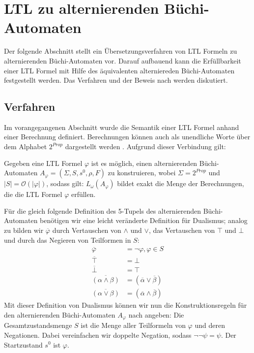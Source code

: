 \section{LTL zu alternierenden Büchi-Automaten}

Der folgende Abschnitt stellt ein Übersetzungsverfahren von LTL Formeln zu alternierenden Büchi-Automaten vor. Darauf aufbauend kann die Erfüllbarkeit einer LTL Formel mit Hilfe des äquivalenten alterniereden Büchi-Automaten festgestellt werden. Das Verfahren und der Beweis nach \cite{vardi+96} werden diskutiert.


\subsection{Verfahren}
\label{subsection:verfahren}
Im vorangegangenen Abschnitt wurde die Semantik einer LTL Formel anhand einer Berechnung definiert. Berechnungen können auch als unendliche Worte über dem Alphabet $2^{Prop}$ dargestellt werden \cite{vardi+96}. Aufgrund dieser Verbindung gilt:
\begin{satz}\cite{vardi+96}
\label{LTL->ABA}
    Gegeben eine LTL Formel $\varphi$ ist es möglich, einen alternierenden Büchi-Automaten $A_\varphi = (\Sigma, S, s^0, \rho, F)$ zu konstruieren, wobei $\Sigma = 2^{Prop}$ und $|S| = \mathcal{O}(|\varphi|)$, sodass gilt: $L_\omega(A_\varphi)$ bildet exakt die Menge der Berechnungen, die die LTL Formel $\varphi$ erfüllen.
\end{satz}
Für die gleich folgende Definition des 5-Tupels des alternierenden Büchi-Automaten benötigen wir eine leicht veränderte Definition für Dualismus; analog zu \cite{vardi+96} bilden wir $\overline{\varphi}$ durch Vertauschen von $\land$ und $\lor$, das Vertauschen von $\top$ und $\bot$ und durch das Negieren von Teilformen in $S$:
\begin{equation}
\label{aba-zu-ltl:dualismus}
\begin{split}
    \overline{\varphi} &= \lnot\varphi, \varphi \in S\\
    \overline{\top} &= \bot\\
    \overline{\bot} &= \top\\
    \overline{(\alpha \land \beta)} &= (\overline{\alpha} \lor \overline{\beta})\\
    \overline{(\alpha \lor \beta)} &= (\overline{\alpha} \land \overline{\beta})
\end{split}
\end{equation}
Mit dieser Definition von Dualismus können wir nun die Konstruktionsregeln für den alternierenden Büchi-Automaten $A_\varphi$ nach \cite{vardi+96} angeben: Die Gesamtzustandsmenge $S$ ist die Menge aller Teilformeln von $\varphi$ und deren Negationen. Dabei vereinfachen wir doppelte Negation, sodass $\lnot\lnot\psi = \psi$. Der Startzustand $s^0$ ist $\varphi$. 
